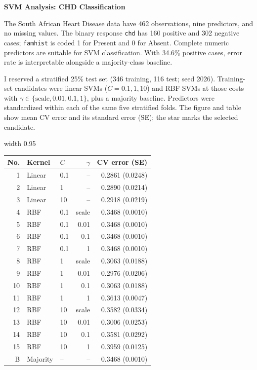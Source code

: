 \documentclass[11pt]{article}
\begin{document}
\begin{center}
{\normalsize\bfseries SVM Analysis: CHD Classification}
\end{center}
\vspace{-4pt}

The South African Heart Disease data have 462 observations, nine predictors, and no missing values. The binary response \texttt{chd} has 160 positive and 302 negative cases; \texttt{famhist} is coded 1 for Present and 0 for Absent. Complete numeric predictors are suitable for SVM classification. With 34.6\% positive cases, error rate is interpretable alongside a majority-class baseline.

I reserved a stratified 25\% test set (346 training, 116 test; seed 2026). Training-set candidates were linear SVMs (\(C=0.1,1,10\)) and RBF SVMs at those costs with \(\gamma\in\{\text{scale},0.01,0.1,1\}\), plus a majority baseline. Predictors were standardized within each of the same five stratified folds. The figure and table show mean CV error and its standard error (SE); the star marks the selected candidate.

\begin{center}
\pdfximage width 0.95\linewidth {svm-cv-errors.pdf}
\pdfrefximage\pdflastximage
\end{center}
\vspace{-6pt}

\begin{center}
\setlength{\tabcolsep}{7pt}
\renewcommand{\arraystretch}{0.88}
\begin{tabular}{rllrr}
\hline
No. & Kernel & \(C\) & \(\gamma\) & CV error (SE) \\
\hline
1 & Linear & 0.1 & -- & 0.2861 (0.0248) \\
2 & Linear & 1 & -- & 0.2890 (0.0214) \\
3 & Linear & 10 & -- & 0.2918 (0.0219) \\
4 & RBF & 0.1 & scale & 0.3468 (0.0010) \\
5 & RBF & 0.1 & 0.01 & 0.3468 (0.0010) \\
6 & RBF & 0.1 & 0.1 & 0.3468 (0.0010) \\
7 & RBF & 0.1 & 1 & 0.3468 (0.0010) \\
8 & RBF & 1 & scale & 0.3063 (0.0188) \\
9 & RBF & 1 & 0.01 & 0.2976 (0.0206) \\
10 & RBF & 1 & 0.1 & 0.3063 (0.0188) \\
11 & RBF & 1 & 1 & 0.3613 (0.0047) \\
12 & RBF & 10 & scale & 0.3582 (0.0334) \\
13 & RBF & 10 & 0.01 & 0.3006 (0.0253) \\
14 & RBF & 10 & 0.1 & 0.3581 (0.0292) \\
15 & RBF & 10 & 1 & 0.3959 (0.0125) \\
B & Majority & -- & -- & 0.3468 (0.0010) \\
\hline
\end{tabular}
\end{center}
\vspace{-5pt}
\end{document}
